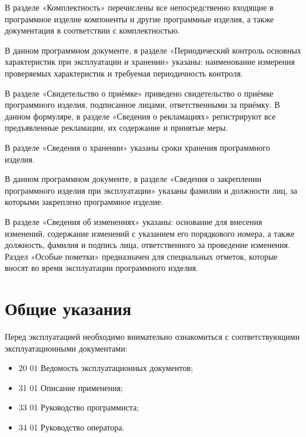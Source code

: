 \documentclass[14pt,a4paper,final]{extreport}
\begin{document}
В разделе «Комплектность» перечислены все непосредственно входящие в программное изделие компоненты и другие программные изделия, а также документация в соответствии с комплектностью.

В данном программном документе, в разделе «Периодический контроль основных характеристик при эксплуатации и хранении» указаны: наименование измерения проверяемых характеристик и требуемая периодичность контроля.

В разделе «Свидетельство о приёмке» приведено свидетельство о приёмке программного изделия, подписанное лицами, ответственными за приёмку.
В данном формуляре, в разделе «Сведения о рекламациях» регистрируют все предъявленные рекламации, их содержание и принятые меры.

В разделе «Сведения о хранении» указаны сроки хранения программного изделия.

В данном программном документе, в разделе «Сведения о закреплении программного изделия при эксплуатации» указаны фамилии и должности лиц, за которыми закреплено программное изделие.

В разделе «Сведения об изменениях» указаны: основание для внесения изменений, содержание изменений с указанием его порядкового номера, а также должность, фамилия и подпись лица, ответственного за проведение изменения.
Раздел «Особые пометки» предназначен для специальных отметок, которые вносят во время эксплуатации программного изделия.

\pagebreak


\tableofcontents



\pagebreak

\chapter{Общие указания}

Перед эксплуатацией необходимо внимательно ознакомиться с соответствующими эксплуатационными документами:

\begin{itemize}
	\item {} 20 01 Ведомость эксплуатационных документов;
	\item {} 31 01 Описание применения;
	\item {} 33 01 Руководство программиста;
	\item {} 34 01 Руководство оператора.
	
\end{itemize}
\end{document}
